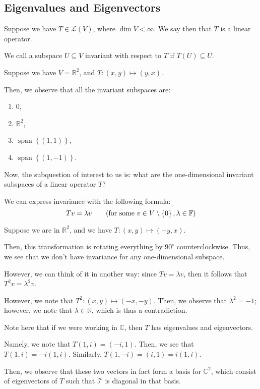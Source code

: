 \documentclass[openany]{book}
\newcommand{\CC}{\mathbb{C}}
\newcommand{\RR}{\mathbb{R}}
\DeclareMathOperator*{\vspan}{span}
\begin{document}
\subsection{Eigenvalues and Eigenvectors}
\begin{defn}
	Suppose we have $T \in \mathcal L(V)$, where $\dim V < \infty$. We say then that $T$ is a linear operator.
\end{defn}
\begin{defn}[Invariance]
	We call a subspace $U \subseteq V$ invariant with respect to $T$ if $T(U) \subseteq U$.
\end{defn}
\begin{example}
	Suppose we have $V = \RR^{2}$, and $T: (x,y) \mapsto (y,x)$.
	
	Then, we observe that all the invariant subspaces are:
	\begin{enumerate}
		\item $0$,
		\item $\RR^{2}$,
		\item $\vspan\left\{  (1,1)\right\}$,
		\item $\vspan \left\{  (1,-1)\right\}$.
	\end{enumerate}

	Now, the subquestion of interest to us is: what are the one-dimensional invariant subspaces of a linear operator $T$?
\end{example}

\begin{thm}[Invariance of $T$]
	We can express invariance with the following formula:
	\begin{equation*}
		Tv = \lambda v \tag{for some $v \in V \setminus \left\{  0\right\}, \lambda \in \mathbb{F}$}
	\end{equation*}
\end{thm}

\begin{example}
	Suppose we are in $\RR^{2}$, and we have $T : (x,y) \mapsto (-y,x)$.
	
	Then, this transformation is rotating everything by $90^{\circ}$ counterclockwise. Thus, we see that we don't have invariance for any one-dimensional subspace.
	
	However, we can think of it in another way: since $Tv = \lambda v$, then it follows that $T^{2}v = \lambda^{2}v$.
	
	However, we note that $T^{2}:(x,y) \mapsto (-x,-y)$. Then, we observe that $\lambda^{2} = -1$; however, we note that $\lambda \in \RR$, which is thus a contradiction.
\end{example}
\begin{rmk}
	Note here that if we were working in $\CC$, then $T$ has eigenvalues and eigenvectors.
	
	Namely, we note that $T(1,i) = (-i,1)$. Then, we see that $T(1,i) = -i(1,i)$. Similarly, $T(1,-i) = (i, 1) = i(1,i)$.
	
	Then, we observe that these two vectors in fact form a basis for $\CC^{2}$, which consist of eigenvectors of $T$ such that $\mathcal T$ is diagonal in that basis.
\end{rmk}
\end{document}
